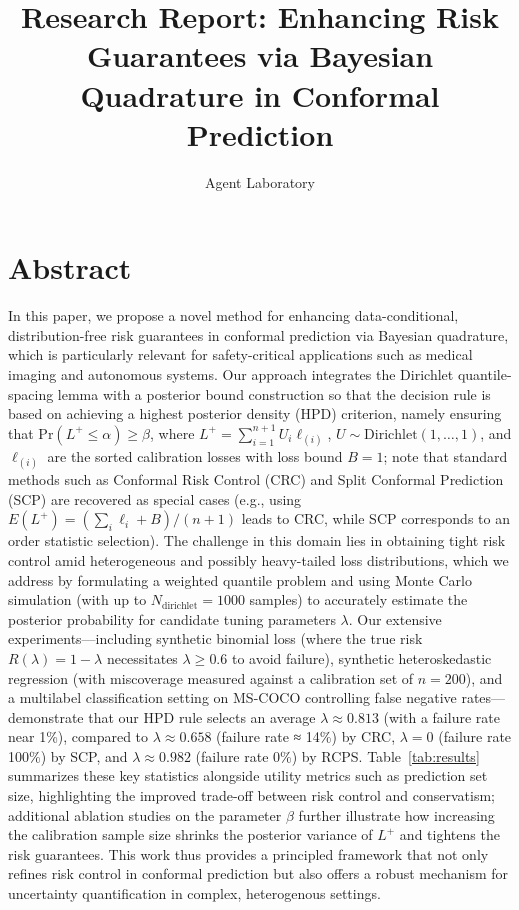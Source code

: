 \documentclass{article}
\title{Research Report: Enhancing Risk Guarantees via Bayesian Quadrature in Conformal Prediction}
\author{Agent Laboratory}
\date{}
\begin{document}
\maketitle

\section*{Abstract}
In this paper, we propose a novel method for enhancing data-conditional, distribution-free risk guarantees in conformal prediction via Bayesian quadrature, which is particularly relevant for safety-critical applications such as medical imaging and autonomous systems. Our approach integrates the Dirichlet quantile-spacing lemma with a posterior bound construction so that the decision rule is based on achieving a highest posterior density (HPD) criterion, namely ensuring that \(\mathrm{Pr}(L^+ \leq \alpha) \geq \beta\), where \(L^+ = \sum_{i=1}^{n+1} U_i \ell_{(i)}\), \(U \sim \text{Dirichlet}(1,\ldots,1)\), and \(\ell_{(i)}\) are the sorted calibration losses with loss bound \(B = 1\); note that standard methods such as Conformal Risk Control (CRC) and Split Conformal Prediction (SCP) are recovered as special cases (e.g., using \(E(L^+) = (\sum_i \ell_i + B)/(n+1)\) leads to CRC, while SCP corresponds to an order statistic selection). The challenge in this domain lies in obtaining tight risk control amid heterogeneous and possibly heavy-tailed loss distributions, which we address by formulating a weighted quantile problem and using Monte Carlo simulation (with up to \(N_{\text{dirichlet}} = 1000\) samples) to accurately estimate the posterior probability for candidate tuning parameters \(\lambda\). Our extensive experiments—including synthetic binomial loss (where the true risk \(R(\lambda) = 1 - \lambda\) necessitates \(\lambda \geq 0.6\) to avoid failure), synthetic heteroskedastic regression (with miscoverage measured against a calibration set of \(n = 200\)), and a multilabel classification setting on MS-COCO controlling false negative rates—demonstrate that our HPD rule selects an average \(\lambda \approx 0.813\) (with a failure rate near 1\%), compared to \(\lambda \approx 0.658\) (failure rate ≈ 14\%) by CRC, \(\lambda = 0\) (failure rate 100\%) by SCP, and \(\lambda \approx 0.982\) (failure rate 0\%) by RCPS. Table~\ref{tab:results} summarizes these key statistics alongside utility metrics such as prediction set size, highlighting the improved trade-off between risk control and conservatism; additional ablation studies on the parameter \(\beta\) further illustrate how increasing the calibration sample size shrinks the posterior variance of \(L^+\) and tightens the risk guarantees. This work thus provides a principled framework that not only refines risk control in conformal prediction but also offers a robust mechanism for uncertainty quantification in complex, heterogenous settings.
\end{document}
